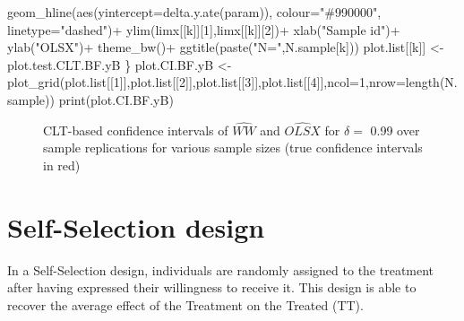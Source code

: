 \documentclass[
]{book}
\newenvironment{Shaded}{\begin{snugshade}}{\end{snugshade}}
\newcommand{\AttributeTok}[1]{\textcolor[rgb]{0.77,0.63,0.00}{#1}}
\newcommand{\DecValTok}[1]{\textcolor[rgb]{0.00,0.00,0.81}{#1}}
\newcommand{\FunctionTok}[1]{\textcolor[rgb]{0.00,0.00,0.00}{#1}}
\newcommand{\NormalTok}[1]{#1}
\newcommand{\OtherTok}[1]{\textcolor[rgb]{0.56,0.35,0.01}{#1}}
\newcommand{\SpecialCharTok}[1]{\textcolor[rgb]{0.00,0.00,0.00}{#1}}
\newcommand{\StringTok}[1]{\textcolor[rgb]{0.31,0.60,0.02}{#1}}
\theoremstyle{definition}
\theoremstyle{definition}
\theoremstyle{definition}
\theoremstyle{definition}
\theoremstyle{remark}
\begin{document}
\begin{Shaded}
\begin{Highlighting}[]
      \FunctionTok{geom\_hline}\NormalTok{(}\FunctionTok{aes}\NormalTok{(}\AttributeTok{yintercept=}\FunctionTok{delta.y.ate}\NormalTok{(param)), }\AttributeTok{colour=}\StringTok{"\#990000"}\NormalTok{, }\AttributeTok{linetype=}\StringTok{"dashed"}\NormalTok{)}\SpecialCharTok{+}
      \FunctionTok{ylim}\NormalTok{(limx[[k]][}\DecValTok{1}\NormalTok{],limx[[k]][}\DecValTok{2}\NormalTok{])}\SpecialCharTok{+}
      \FunctionTok{xlab}\NormalTok{(}\StringTok{"Sample id"}\NormalTok{)}\SpecialCharTok{+}
      \FunctionTok{ylab}\NormalTok{(}\StringTok{"OLSX"}\NormalTok{)}\SpecialCharTok{+}
      \FunctionTok{theme\_bw}\NormalTok{()}\SpecialCharTok{+}
      \FunctionTok{ggtitle}\NormalTok{(}\FunctionTok{paste}\NormalTok{(}\StringTok{"N="}\NormalTok{,N.sample[k]))}
\NormalTok{  plot.list[[k]] }\OtherTok{\textless{}{-}}\NormalTok{ plot.test.CLT.BF.yB}
\NormalTok{\}}
\NormalTok{plot.CI.BF.yB }\OtherTok{\textless{}{-}} \FunctionTok{plot\_grid}\NormalTok{(plot.list[[}\DecValTok{1}\NormalTok{]],plot.list[[}\DecValTok{2}\NormalTok{]],plot.list[[}\DecValTok{3}\NormalTok{]],plot.list[[}\DecValTok{4}\NormalTok{]],}\AttributeTok{ncol=}\DecValTok{1}\NormalTok{,}\AttributeTok{nrow=}\FunctionTok{length}\NormalTok{(N.sample))}
\FunctionTok{print}\NormalTok{(plot.CI.BF.yB)}
\end{Highlighting}
\end{Shaded}

\begin{figure}[htbp]

{\centering {}

}

\caption{CLT-based confidence intervals of $\hat{WW}$ and $\hat{OLSX}$ for $\delta=$ 0.99 over sample replications for various sample sizes (true confidence intervals in red)}\label{fig:confintervalCLTBF}
\end{figure}

\hypertarget{sec:design2}{%
\section{Self-Selection design}\label{sec:design2}}

In a Self-Selection design, individuals are randomly assigned to the treatment after having expressed their willingness to receive it.
This design is able to recover the average effect of the Treatment on the Treated (TT).
\end{document}
